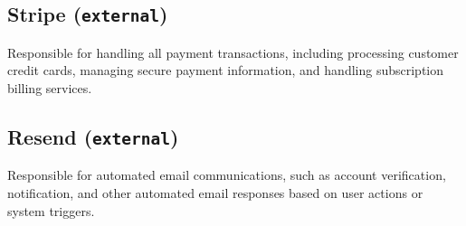 \documentclass{article}
\begin{document}
\subsection{Stripe (\texttt{external})}

Responsible for handling all payment transactions, including processing customer credit cards, managing secure payment information, and handling subscription billing services.

\subsection{Resend (\texttt{external})}

Responsible for automated email communications, such as account verification, notification, and other automated email responses based on user actions or system triggers.
\end{document}
